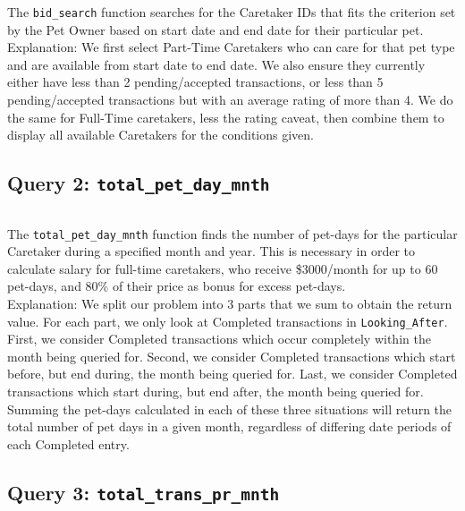 \documentclass[10pt]{article}
\begin{document}
The \texttt{bid\_search} function searches for the Caretaker IDs that fits the criterion set by the Pet Owner based on start date and end date for their particular pet. \\

Explanation: We first select Part-Time Caretakers who can care for that pet type and are available from start date to end date. We also ensure they currently either have less than 2 pending/accepted transactions, or less than 5 pending/accepted transactions but with an average rating of more than 4. We do the same for Full-Time caretakers, less the rating caveat, then combine them to display all available Caretakers for the conditions given.

\subsection{Query 2: \texttt{total\_pet\_day\_mnth}}
\begin{figure}[H]
\inputminted[breaklines, tabsize=8, obeytabs, fontsize=\footnotesize]{postgresql}{./codes/query_total_pet_day_mnth.sql}
\end{figure}

The \texttt{total\_pet\_day\_mnth} function finds the number of pet-days for the particular Caretaker during a specified month and year. This is necessary in order to calculate salary for full-time caretakers, who receive \$3000/month for up to 60 pet-days, and 80\% of their price as bonus for excess pet-days. \\

Explanation: We split our problem into 3 parts that we sum to obtain the return value. For each part, we only look at Completed transactions in \texttt{Looking\_After}. First, we consider Completed transactions which occur completely within the month being queried for. Second, we consider Completed transactions which start before, but end during, the month being queried for. Last, we consider Completed transactions which start during, but end after, the month being queried for. Summing the pet-days calculated in each of these three situations will return the total number of pet days in a given month, regardless of differing date periods of each Completed entry.

\subsection{Query 3: \texttt{total\_trans\_pr\_mnth}}
\begin{figure}[H]
\inputminted[breaklines, tabsize=8, obeytabs, fontsize=\footnotesize]{postgresql}{./codes/query_total_trans_pr_mnth.sql}
\end{figure}
\end{document}
